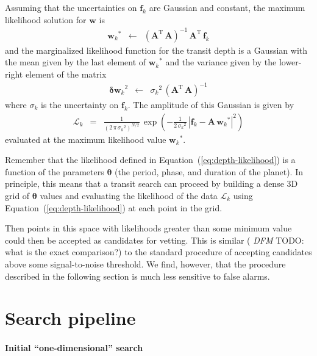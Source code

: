 \documentclass[12pt,preprint]{aastex}
\newcommand{\Eq}[1]{Equation~(\ref{eq:#1})}
\newcommand{\eq}[1]{\Eq{#1}}
\newcommand{\eqlabel}[1]{\label{eq:#1}}
\newcommand{\T}{\ensuremath{\mathrm{T}}}
\newcommand{\bvec}[1]{{\ensuremath{\boldsymbol{#1}}}}
\newcommand{\todo}[3]{{\color{#2} \emph{#1} TODO: #3}}
\newcommand{\dfmtodo}[1]{\todo{DFM}{red}{#1}}
\begin{document}
Assuming that the uncertainties on $\bvec{f}_k$ are Gaussian and constant,
the maximum likelihood solution for \bvec{w} is
\begin{eqnarray}
{\bvec{w}_k}^* &\gets& \left( \bvec{A}^\T\,\bvec{A} \right)^{-1}\,
                       \bvec{A}^\T\,\bvec{f}_k
\end{eqnarray}
and the marginalized likelihood function for the transit depth is a Gaussian
with the mean given by the last element of ${\bvec{w}_k}^*$ and the variance
given by the lower-right element of the matrix
\begin{eqnarray}
{\bvec{\delta w}_k}^2 &\gets& {\sigma_k}^2 \,
            \left( \bvec{A}^\T\,\bvec{A} \right)^{-1}
\end{eqnarray}
where $\sigma_k$ is the uncertainty on $\bvec{f}_k$.
The amplitude of this Gaussian is given by
\begin{eqnarray}\eqlabel{depth-likelihood}
\mathcal{L}_k &=& \frac{1}{(2\,\pi\,{\sigma_k}^2)^{N/2}}\,\exp\left(
-\frac{1}{2\,{\sigma_k}^2}\,
\left| \bvec{f}_k - \bvec{A}\,{\bvec{w}_k}^* \right|^2
\right)
\end{eqnarray}
evaluated at the maximum likelihood value ${\bvec{w}_k}^*$.

Remember that the likelihood defined in \eq{depth-likelihood} is a function of
the parameters \bvec{\theta} (the period, phase, and duration of the planet).
In principle, this means that a transit search can proceed by building a dense
3D grid of \bvec{\theta} values and evaluating the likelihood of the data
$\mathcal{L}_k$ using \eq{depth-likelihood} at each point in the grid.



Then points in this space with likelihoods greater than some minimum value
could then be accepted as candidates for vetting.
This is similar (\dfmtodo{what is the exact comparison?}) to the standard
procedure of accepting candidates above some signal-to-noise threshold.
We find, however, that the procedure described in the following section is
much less sensitive to false alarms.


\section{Search pipeline}

\paragraph{Initial ``one-dimensional'' search}
\end{document}
